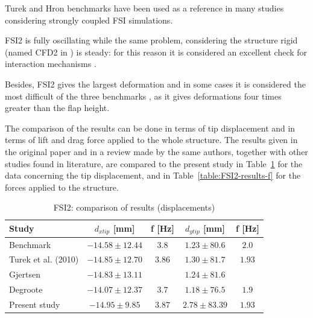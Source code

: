 Turek and Hron benchmarks have been used as a reference in many studies considering strongly coupled FSI simulations. 

FSI2 is fully oscillating while the same problem, considering the structure rigid (named CFD2 in \cite{turek2006proposal}) is steady: for this reason it is considered an excellent check for interaction mechanisms \cite{turek2010numerical}.

Besides, FSI2 gives the largest deformation and in some cases it is considered the most difficult of the three benchmarks \cite{richter2015time}, as it gives deformations four times greater than the flap height.

The comparison of the results can be done in terms of tip displacement and in terms of lift and drag force applied to the whole structure. The results given in the original paper and in a review made by the same authors, together with other studies found in literature, are compared to the present study in Table~\ref{table:FSI2-results-d} for the data concerning the tip displacement, and in Table~\ref{table:FSI2-results-f} for the forces applied to the structure.


\begin{table}[!htb]
	\begin{center}
		\begin{tabular}{ l | c c | c c  |  } 
			Study & $d_{x tip}$ [\si{mm}] & f [\si{Hz}] & $d_{y tip}$ [\si{mm}] & f [\si{Hz}] \\ 
			\hline
			\hline
			Benchmark  \cite{turek2006proposal} & $-14.58\pm12.44$ & $3.8$ & $1.23\pm80.6$ & $2.0$     \\
			Turek et al. (2010) \cite{turek2010numerical} & $-14.85\pm12.70$ & $3.86$ & $1.30\pm81.7$ & $1.93$ \\
			Gjertsen \cite{gjertsen2017development} & $-14.83\pm13.11$ & & $1.24\pm81.6$ & \\
			Degroote \cite{degroote2009interface}  & $-14.07\pm12.37$ & $3.7$ & $1.18\pm76.5$ & $1.9$ \\
			\hline
			Present study & $-14.95\pm9.85$ & $3.87$ & $2.78\pm83.39$ & $1.93$ \\ 
		\end{tabular}
	\end{center}
	\caption{FSI2: comparison of results (displacements)}
	\label{table:FSI2-results-d}
\end{table}

